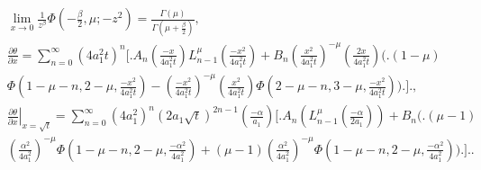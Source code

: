 \documentclass[review]{elsarticle}
\begin{document}
\begin{align}
&\underset{x\to 0}{\lim}\frac{1}{z^{\beta}}\Phi\left(-\frac{\beta}{2},\mu;-z^{2}\right) = \frac{\Gamma(\mu)}{\Gamma(\mu+\frac{\beta}{2})},
\label{lhopital}\\
&\frac{\partial\theta}{\partial x}=\sum_{n=0}^\infty\left(4a_1^2t\right)^n\Bigg[ \Bigg.A_n\left(\frac{-x}{4a_1^2t}\right) L_{n-1}^{\mu}\left(\frac{-x^2}{4a_{1}^2t}\right)+ B_n\left(\frac{x^2}{4a_1^2t}\right)^{-\mu}\left(\frac{2x}{4a_1^2t}\right)\Bigg( \Bigg.(1-\mu)\nonumber\\
&\Phi\left(1-\mu-n, 2-\mu,\frac{-x^2}{4a_{1}^2t}\right)-\left(\frac{-x^2}{4a_{1}^2t}\right)^{-\mu}\left(\frac{x^2}{4a_1^2t}\right)\Phi\left(2-\mu-n, 3-\mu,\frac{-x^2}{4a_{1}^2t}\right)\Bigg) \Bigg.\Bigg] \Bigg.,
\label{der_wrt_x}\\
&\left.\frac{\partial\theta}{\partial x}\right|_{x=\sqrt{t}}=\sum_{n=0}^\infty\left(4a_1^2\right)^n\left(2a_1\sqrt{t}\right)^{2n-1}\left(\frac{-\alpha}{a_1}\right)\Bigg[ \Bigg.A_n\left(L_{n-1}^{\mu}\left(\frac{-\alpha}{2a_1}\right)\right)+ B_n\Bigg( \Bigg.(\mu-1)\nonumber\\
&\left(\frac{\alpha^2}{4a_1^2}\right)^{-\mu}\Phi\left(1-\mu-n, 2-\mu,\frac{-
\alpha^2}{4a_{1}^2}\right)+(\mu-1)\left(\frac{\alpha^2}{4a_1^2}\right)^{-\mu}\Phi\left(1-\mu-n, 2-\mu,\frac{-\alpha^2}{4a_{1}^2}\right)\Bigg) \Bigg.\Bigg] \Bigg..
\label{der_of_theta}
\end{align}
\end{document}
